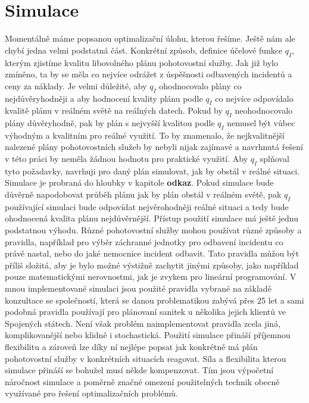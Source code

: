 \section{Simulace}

Momentálně máme popsanou optimalizační úlohu, kterou řešíme. Ještě nám ale chybí jedna velmi podstatná část.
Konkrétní způsob, definice účelové funkce $q_I$, kterým zjistíme kvalitu libovolného plánu pohotovostní služby.
Jak již bylo zmíněno, ta by se měla co nejvíce odrážet z úspěšnosti odbavených incidentů a ceny za náklady.
Je velmi důležité, aby $q_I$ ohodnocovalo plány co nejdůvěryhodněji a aby hodnocení kvality plánu podle $q_I$ co nejvíce odpovídalo kvalitě plánu v reálném světě na reálných datech.
Pokud by $q_I$ neohodnocovalo plány důvěryhodně, pak by plán s nejvyšší kvalitou podle $q_I$ nemusel být vůbec výhodným a kvalitním pro reálné využití.
To by znamenalo, že nejkvalitnější nalezené plány pohotovostních služeb by nebyli nijak zajímavé a navrhnutá řešení v této práci by neměla žádnou hodnotu pro praktické využití.
Aby $q_I$ splňoval tyto požadavky, navrhuji pro daný plán simulovat, jak by obstál v reálné situaci.
Simulace je probraná do hloubky v kapitole \textbf{odkaz}. %
Pokud simulace bude důvěrně napodobovat průběh plánu jak by plán obstál v reálném světě, pak $q_I$ používající simulaci
bude odpovídat nejvěrohodněji reálné situaci a tedy bude ohodnocená kvalita plánu nejdůvěrnější.
Přístup použití simulace má ještě jednu podstatnou výhodu.
Různé pohotovostní služby mohou používat různé způsoby a pravidla, například pro výběr záchranné jednotky pro odbavení incidentu co právě nastal, nebo do jaké nemocnice incident odbavit.
Tato pravidla můžou být příliš složitá, aby je bylo možné výstižně zachytit jinými způsoby, jako například pouze matematickými nerovnostmi, jak je zvykem pro lineární programování.
V mnou implementované simulaci jsou použité pravidla vybrané na základě konzultace se společností, která se danou problematikou zabývá přes 25 let a sami podobná pravidla používají pro plánovaní sanitek
u několika jejich klientů ve Spojených státech.
Není však problém naimplementovat pravidla zcela jiná, komplikovanější nebo klidně i stochastická.
Použití simulace přináší příjemnou flexibilitu a zároveň lze díky ní nejlépe popsat jak konkrétně má plán pohotovostní služby v konkrétních situacích reagovat.
Síla a flexibilita kterou simulace přináší se bohužel musí někde kompenzovat.
Tím jsou výpočetní náročnost simulace a poměrně značné omezení použitelných technik obecně využívané pro řešení optimalizačních problémů.
\\

